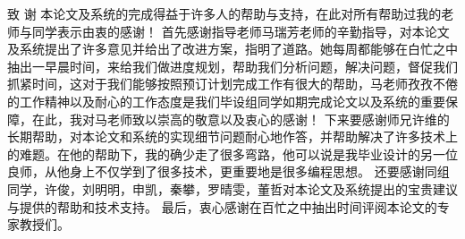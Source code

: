 \documentclass[18pt, twoside, a4paper, dvipdfm]{book}
\begin{document}
致  谢
	本论文及系统的完成得益于许多人的帮助与支持，在此对所有帮助过我的老师与同学表示由衷的感谢！
首先感谢指导老师马瑞芳老师的辛勤指导，对本论文及系统提出了许多意见并给出了改进方案，指明了道路。她每周都能够在白忙之中抽出一早晨时间，来给我们做进度规划，帮助我们分析问题，解决问题，督促我们抓紧时间，这对于我们能够按照预订计划完成工作有很大的帮助，马老师孜孜不倦的工作精神以及耐心的工作态度是我们毕设组同学如期完成论文以及系统的重要保障，在此，我对马老师致以崇高的敬意以及衷心的感谢！
下来要感谢师兄许维的长期帮助，对本论文和系统的实现细节问题耐心地作答，并帮助解决了许多技术上的难题。在他的帮助下，我的确少走了很多弯路，他可以说是我毕业设计的另一位良师，从他身上不仅学到了很多技术，更重要地是很多编程思想。
还要感谢同组同学，许俊，刘明明，申凯，秦攀，罗晴雯，董哲对本论文及系统提出的宝贵建议与提供的帮助和技术支持。
最后，衷心感谢在百忙之中抽出时间评阅本论文的专家教授们。
\end{document}

